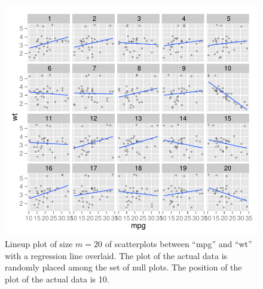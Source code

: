 \begin{figure}[hbtp]
\begin{center}
\includegraphics[scale=1.2]{nullabor-reg-ex.pdf}
\caption{Lineup plot of size $m = 20$ of scatterplots between ``mpg'' and ``wt'' with a regression line overlaid. The plot of the actual data is randomly placed among the set of null plots. The position of the plot of the actual data is 10. }
\label{lineup-reg}
\end{center}
\end{figure}

%

